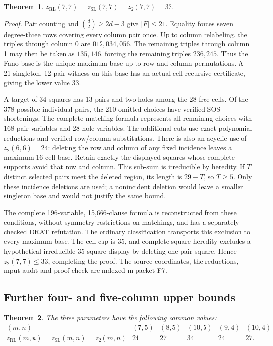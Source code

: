 \documentclass[11pt,a4paper]{article}
\newtheorem{theorem}{Theorem}[section]
\theoremstyle{definition}
\newcommand{\zr}{z_{\mathrm{RL}}}
\newcommand{\zs}{z_{\mathrm{SL}}}
\newcommand{\zt}{z_2}
\begin{document}
\begin{theorem}\label{thm:seven-square}
$\zr(7,7)=\zs(7,7)=\zt(7,7)=33$.
\end{theorem}
\begin{proof}
Pair counting and $\binom d2\ge2d-3$ give $|F|\le21$.
Equality forces seven degree-three rows covering every column pair once.
Up to column relabeling, the triples through column 0 are
$012,034,056$. The remaining triples through column 1 may then be taken as
$135,146$, forcing the remaining triples $236,245$.
Thus the Fano base is the unique maximum base up to row and column
permutations. A 21-singleton, 12-pair witness on this base has an
actual-cell recursive certificate, giving the lower value 33.

A target of 34 squares has 13 pairs and two holes among the 28 free
cells. Of the 378 possible individual pairs, the 210 omitted choices
have verified SOS shortenings. The complete matching formula represents
all remaining choices with 168 pair variables and 28 hole variables. The additional cuts use
exact polynomial reductions and verified row/column substitutions.
There is also an acyclic use of $\zt(6,6)=24$: deleting the row and
column of any fixed incidence leaves a maximum 16-cell base. Retain
exactly the displayed squares whose complete supports avoid that row
and column. This sub-sum is irreducible by heredity. If $T$ distinct
selected pairs meet the deleted region, its length is $29-T$, so
$T\ge5$. Only these incidence deletions are used;
a nonincident deletion would leave a smaller singleton base and would
not justify the same bound.

The complete 196-variable, 15,666-clause formula is reconstructed from
these conditions, without symmetry restrictions on matchings, and has
a separately checked DRAT refutation.
The ordinary classification transports this exclusion to every maximum
base. The cell cap is 35, and complete-square heredity excludes a
hypothetical irreducible 35-square display by deleting one pair square.
Hence $\zt(7,7)\le33$, completing the proof. The source coordinates,
the reductions, input audit and proof check are indexed in packet F7.
\end{proof}

\subsection{Further four- and five-column upper bounds}
\label{sec:further-finite}

\begin{theorem}\label{thm:further-finite}
The three parameters have the following common values:
\[
\begin{array}{c|ccccc}
(m,n)&(7,5)&(8,5)&(10,5)&(9,4)&(10,4)\\
\hline
\zr(m,n)=\zs(m,n)=\zt(m,n)&24&27&34&24&27.
\end{array}
\]
\end{theorem}
\end{document}
